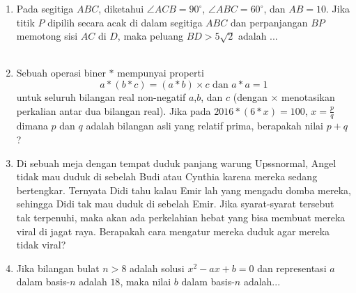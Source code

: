 \documentclass{article}
\begin{document}
\begin{enumerate}[resume]
	\item Pada segitiga $ABC$, diketahui $\angle ACB = 90^\circ$, $\angle ABC = 60^\circ$, dan $AB=10$. Jika titik $P$ dipilih secara acak di dalam segitiga $ABC$ dan perpanjangan $BP$ memotong sisi $AC$ di $D$, maka peluang $BD > 5\sqrt{2}$ adalah ...\\
	\\
	
	\item Sebuah operasi biner $*$ mempunyai properti $$a*(b*c) = (a*b)\times c \text{  dan  } a*a = 1$$
	untuk seluruh bilangan real non-negatif $a$,$b$, dan $c$ (dengan $\times$ menotasikan perkalian antar dua bilangan real). Jika pada $2016*(6*x)=100$, $x = \frac{p}{q}$ dimana $p$ dan $q$ adalah bilangan asli yang relatif prima, berapakah nilai $p+q$?
	
	\item Di sebuah meja dengan tempat duduk panjang warung Upssnormal, Angel tidak mau duduk di sebelah Budi atau Cynthia karena mereka sedang bertengkar. Ternyata Didi tahu kalau Emir lah yang mengadu domba mereka, sehingga Didi tak mau duduk di sebelah Emir. Jika syarat-syarat tersebut tak terpenuhi, maka akan ada perkelahian hebat yang bisa membuat mereka viral di jagat raya. Berapakah cara mengatur mereka duduk agar mereka tidak viral?
	
	\item Jika bilangan bulat $n>8$ adalah solusi $x^2-ax+b=0$ dan representasi $a$ dalam basis-$n$ adalah $18$, maka nilai $b$ dalam basis-$n$ adalah...
	
	
\end{enumerate}
\end{document}
